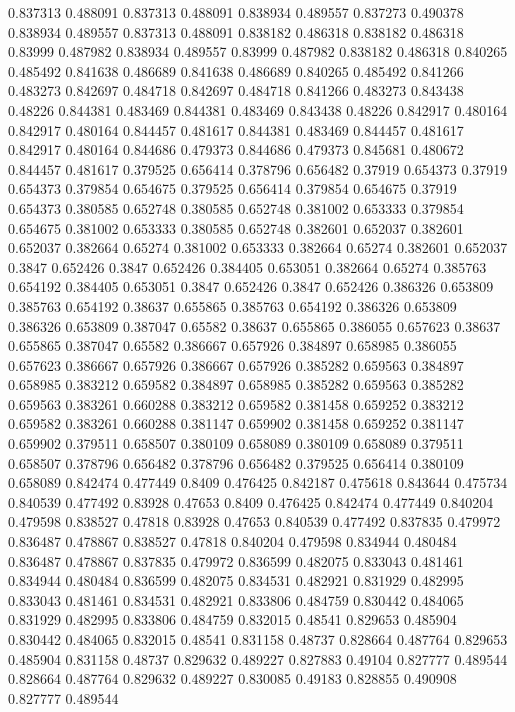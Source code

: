 0.837313 0.488091
0.837313 0.488091
0.838934 0.489557
0.837273 0.490378
0.838934 0.489557
0.837313 0.488091
0.838182 0.486318
0.838182 0.486318
0.83999 0.487982
0.838934 0.489557
0.83999 0.487982
0.838182 0.486318
0.840265 0.485492
0.841638 0.486689
0.841638 0.486689
0.840265 0.485492
0.841266 0.483273
0.842697 0.484718
0.842697 0.484718
0.841266 0.483273
0.843438 0.48226
0.844381 0.483469
0.844381 0.483469
0.843438 0.48226
0.842917 0.480164
0.842917 0.480164
0.844457 0.481617
0.844381 0.483469
0.844457 0.481617
0.842917 0.480164
0.844686 0.479373
0.844686 0.479373
0.845681 0.480672
0.844457 0.481617
0.379525 0.656414
0.378796 0.656482
0.37919 0.654373
0.37919 0.654373
0.379854 0.654675
0.379525 0.656414
0.379854 0.654675
0.37919 0.654373
0.380585 0.652748
0.380585 0.652748
0.381002 0.653333
0.379854 0.654675
0.381002 0.653333
0.380585 0.652748
0.382601 0.652037
0.382601 0.652037
0.382664 0.65274
0.381002 0.653333
0.382664 0.65274
0.382601 0.652037
0.3847 0.652426
0.3847 0.652426
0.384405 0.653051
0.382664 0.65274
0.385763 0.654192
0.384405 0.653051
0.3847 0.652426
0.3847 0.652426
0.386326 0.653809
0.385763 0.654192
0.38637 0.655865
0.385763 0.654192
0.386326 0.653809
0.386326 0.653809
0.387047 0.65582
0.38637 0.655865
0.386055 0.657623
0.38637 0.655865
0.387047 0.65582
0.386667 0.657926
0.384897 0.658985
0.386055 0.657623
0.386667 0.657926
0.386667 0.657926
0.385282 0.659563
0.384897 0.658985
0.383212 0.659582
0.384897 0.658985
0.385282 0.659563
0.385282 0.659563
0.383261 0.660288
0.383212 0.659582
0.381458 0.659252
0.383212 0.659582
0.383261 0.660288
0.381147 0.659902
0.381458 0.659252
0.381147 0.659902
0.379511 0.658507
0.380109 0.658089
0.380109 0.658089
0.379511 0.658507
0.378796 0.656482
0.378796 0.656482
0.379525 0.656414
0.380109 0.658089
0.842474 0.477449
0.8409 0.476425
0.842187 0.475618
0.843644 0.475734
0.840539 0.477492
0.83928 0.47653
0.8409 0.476425
0.842474 0.477449
0.840204 0.479598
0.838527 0.47818
0.83928 0.47653
0.840539 0.477492
0.837835 0.479972
0.836487 0.478867
0.838527 0.47818
0.840204 0.479598
0.834944 0.480484
0.836487 0.478867
0.837835 0.479972
0.836599 0.482075
0.833043 0.481461
0.834944 0.480484
0.836599 0.482075
0.834531 0.482921
0.831929 0.482995
0.833043 0.481461
0.834531 0.482921
0.833806 0.484759
0.830442 0.484065
0.831929 0.482995
0.833806 0.484759
0.832015 0.48541
0.829653 0.485904
0.830442 0.484065
0.832015 0.48541
0.831158 0.48737
0.828664 0.487764
0.829653 0.485904
0.831158 0.48737
0.829632 0.489227
0.827883 0.49104
0.827777 0.489544
0.828664 0.487764
0.829632 0.489227
0.830085 0.49183
0.828855 0.490908
0.827777 0.489544
